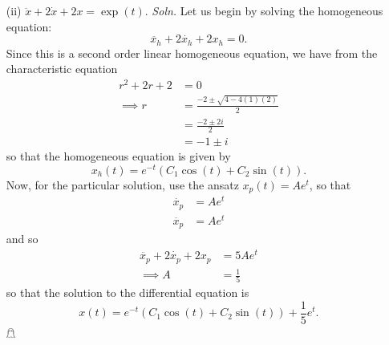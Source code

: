 \documentclass{article}
\begin{document}
\begin{itemize}
\begin{itemize}
        \item[(ii)] $\ddot{x} + 2\dot{x} + 2x = \exp(t)$.
        \newline\newline
        \textit{Soln.} Let us begin by solving the homogeneous equation:
        \[\ddot{x_h} + 2\dot{x_h} + 2x_h = 0.\]
        Since this is a second order linear homogeneous equation, we have from the characteristic equation
        \begin{align*}
            r^2 + 2r + 2 &= 0\\
            \implies r &= \frac{-2 \pm \sqrt{4 - 4(1)(2)}}{2}\\
            &= \frac{-2 \pm 2i}{2}\\
            &= -1 \pm i
        \end{align*}
        so that the homogeneous equation is given by
        \[x_h(t) = e^{-t}(C_1\cos(t) + C_2\sin(t)).\]
        Now, for the particular solution, use the ansatz $x_p(t) = Ae^t$, so that
        \begin{align*}
            \dot{x_p} &= Ae^t\\
            \ddot{x_p} &= Ae^t
        \end{align*}
        and so
        \begin{align*}
            \ddot{x_p} + 2\dot{x_p} + 2x_p &= 5Ae^t\\
            \implies A &= \frac{1}{5}
        \end{align*}
        so that the solution to the differential equation is
        \[x(t) = e^{-t}(C_1\cos(t) + C_2\sin(t)) + \frac{1}{5}e^t.\]
        \hfill $\mathghost$


\end{itemize}
\end{itemize}
\end{document}
